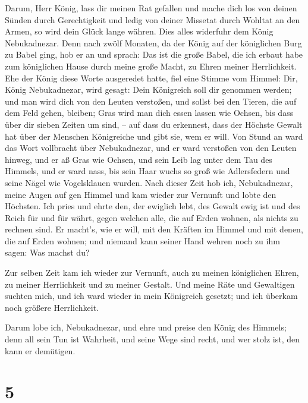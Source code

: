  Darum, Herr König, lass dir meinen Rat gefallen und
mache dich los von deinen Sünden durch Gerechtigkeit und ledig von
deiner Missetat durch Wohltat an den Armen, so wird dein Glück lange
währen.  Dies alles widerfuhr dem König Nebukadnezar.
 Denn nach zwölf Monaten, da der König auf der
königlichen Burg zu Babel ging,  hob er an und sprach:
Das ist die große Babel, die ich erbaut habe zum königlichen Hause durch
meine große Macht, zu Ehren meiner Herrlichkeit.  Ehe der
König diese Worte ausgeredet hatte, fiel eine Stimme vom Himmel: Dir,
König Nebukadnezar, wird gesagt: Dein Königreich soll dir genommen
werden;  und man wird dich von den Leuten verstoßen, und
sollst bei den Tieren, die auf dem Feld gehen, bleiben; Gras wird man
dich essen lassen wie Ochsen, bis dass über dir sieben Zeiten um sind,
-- auf dass du erkennest, dass der Höchste Gewalt hat über der Menschen
Königreiche und gibt sie, wem er will.  Von Stund an ward
das Wort vollbracht über Nebukadnezar, und er ward verstoßen von den
Leuten hinweg, und er aß Gras wie Ochsen, und sein Leib lag unter dem
Tau des Himmels, und er ward nass, bis sein Haar wuchs so groß wie
Adlersfedern und seine Nägel wie Vogelsklauen wurden. 
Nach dieser Zeit hob ich, Nebukadnezar, meine Augen auf gen Himmel und
kam wieder zur Vernunft und lobte den Höchsten. Ich pries und ehrte den,
der ewiglich lebt, des Gewalt ewig ist und des Reich für und für währt,
 gegen welchen alle, die auf Erden wohnen, als nichts zu
rechnen sind. Er macht's, wie er will, mit den Kräften im Himmel und mit
denen, die auf Erden wohnen; und niemand kann seiner Hand wehren noch zu
ihm sagen: Was machst du?

 Zur selben Zeit kam ich wieder zur Vernunft, auch zu
meinen königlichen Ehren, zu meiner Herrlichkeit und zu meiner Gestalt.
Und meine Räte und Gewaltigen suchten mich, und ich ward wieder in mein
Königreich gesetzt; und ich überkam noch größere Herrlichkeit.

 Darum lobe ich, Nebukadnezar, und ehre und preise den
König des Himmels; denn all sein Tun ist Wahrheit, und seine Wege sind
recht, und wer stolz ist, den kann er demütigen.

\hypertarget{section-4}{%
\section{5}\label{section-4}}

